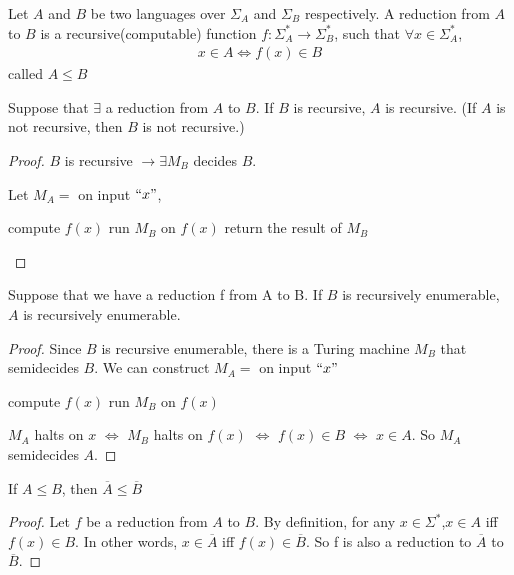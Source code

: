 \begin{definition}
    Let $A$ and $B$ be two languages over $\Sigma_A$ and $\Sigma_B$ respectively. A reduction from $A$ to $B$ is a recursive(computable) function $f:\Sigma_A^*\to\Sigma_B^*$, such that $\forall x\in\Sigma_A^*$,
    \begin{align*}
        x\in A \iff f(x) \in B
    \end{align*}
    called $A\le B$
\end{definition}

\begin{theorem}
    Suppose that $\exists$ a reduction from $A$ to $B$. If $B$ is recursive, $A$ is recursive. (If $A$ is not recursive, then $B$ is not recursive.)
\end{theorem}
\begin{proof}
    $B$ is recursive $\to\exists M_B$ decides $B$. 

    Let $M_A=$ on input $``x"$,
    \begin{algorithm}[H]
        \caption{$M_A$}
        \begin{algorithmic}
            \State compute $f(x)$
            \State run $M_B$ on $f(x)$
            \State return the result of $M_B$
        \end{algorithmic}
    \end{algorithm}
\end{proof}

\begin{theorem}
    Suppose that we have a reduction f from A to B. If $B$ is recursively enumerable, $A$ is recursively enumerable. 
\end{theorem}

\begin{proof}
    Since $B$ is recursive enumerable, there is a Turing machine $M_B$ that semidecides $B$. We can construct $M_A=$ on input ${``x"}$
    \begin{algorithm}[H]
        \caption{$M_A$}
        \begin{algorithmic}
            \State compute $f(x)$
            \State run $M_B$ on $f(x)$
        \end{algorithmic}
    \end{algorithm}
    $M_A$ halts on $x$ $\iff$ $M_B$ halts on $f(x)$ $\iff$ $f(x)\in B$ $\iff$ $x\in A$. So $M_A$ semidecides $A$. 
\end{proof}

\begin{theorem}
    If $A\le B$, then $\overline{A}\le \overline{B}$
\end{theorem}
\begin{proof}
    Let $f$ be a reduction from $A$ to $B$. By definition, for any $x \in \Sigma^*$,$x\in A$ iff $f(x)\in B$. In other words, $x\in \overline{A}$ iff $f(x)\in \overline{B}$. So f is also a reduction to $\overline{A}$ to $\overline{B}$.
\end{proof}

